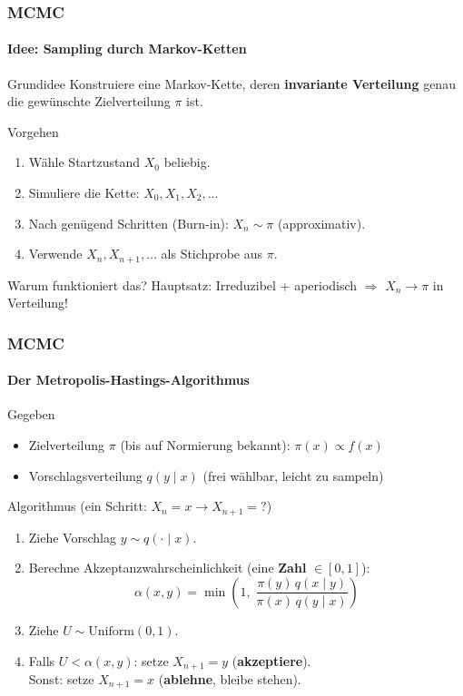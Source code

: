 \documentclass{beamer}
\begin{document}
\begin{frame}
    \frametitle{MCMC}
\framesubtitle{Idee: Sampling durch Markov-Ketten}
    \begin{block}{Grundidee}
Konstruiere eine Markov-Kette, deren \textbf{invariante Verteilung} genau die gewünschte Zielverteilung $\pi$ ist.
\end{block}
\begin{block}{Vorgehen}
\begin{enumerate}
\item Wähle Startzustand $X_0$ beliebig.
\item Simuliere die Kette: $X_0, X_1, X_2, \ldots$
\item Nach genügend Schritten (Burn-in): $X_n \sim \pi$ (approximativ).
\item Verwende $X_n, X_{n+1}, \ldots$ als Stichprobe aus $\pi$.
\end{enumerate}
\end{block}
\begin{block}{Warum funktioniert das?}
Hauptsatz: Irreduzibel + aperiodisch $\Rightarrow$ $X_n \to \pi$ in Verteilung!
\end{block}
 \end{frame}



\begin{frame}
    \frametitle{MCMC}
\framesubtitle{Der Metropolis-Hastings-Algorithmus}
    \begin{block}{Gegeben}
\begin{itemize}
\item Zielverteilung $\pi$ (bis auf Normierung bekannt): $\pi(x) \propto f(x)$
\item Vorschlagsverteilung $q(y \mid x)$ (frei wählbar, leicht zu sampeln)
\end{itemize}
\end{block}
\begin{block}{Algorithmus (ein Schritt: $X_n = x \to X_{n+1} = ?$)}
\begin{enumerate}
\item Ziehe Vorschlag $y \sim q(\cdot \mid x)$.
\item Berechne Akzeptanzwahrscheinlichkeit (eine \textbf{Zahl} $\in [0,1]$):
\[
\alpha(x, y) = \min\!\left(1, \;\frac{\pi(y)\, q(x \mid y)}{\pi(x)\, q(y \mid x)}\right)
\]
\item Ziehe $U \sim \text{Uniform}(0,1)$.
\item Falls $U < \alpha(x,y)$: setze $X_{n+1} = y$ \quad (\textbf{akzeptiere}).\\
      Sonst: setze $X_{n+1} = x$ \quad (\textbf{ablehne}, bleibe stehen).
\end{enumerate}
\end{block}
 \end{frame}
\end{document}
